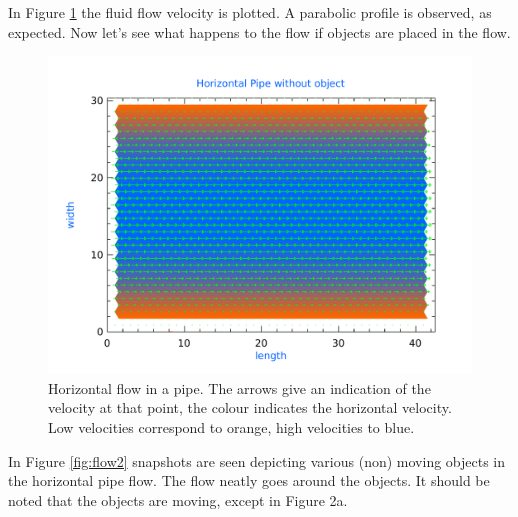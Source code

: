 In Figure \ref{fig:flow1} the fluid flow velocity is plotted. A parabolic profile is observed, as expected. Now let's see what happens to the flow if objects are placed in the flow.

\begin{figure}[ht!]
\centering
\includegraphics[width=.7\textwidth]{plots/flow.pdf}
\caption{Horizontal flow in a pipe. The arrows give an indication of the velocity at that point, the colour indicates the horizontal velocity. Low velocities correspond to orange, high velocities to blue. }
\label{fig:flow1}
\end{figure}



In Figure \ref{fig:flow2} snapshots are seen depicting various (non) moving objects in the horizontal pipe flow. The flow neatly goes around the objects. It should be noted that the objects are moving, except in Figure 2a.

